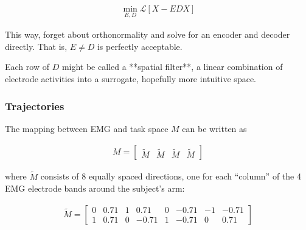 \documentclass[../main.tex]{subfiles}
\begin{document}
\begin{align}
  \min_{E,D}{\mathcal{L}\left[X - EDX\right]}
\end{align}

This way, forget about orthonormality and solve for an encoder and decoder directly. That is, $E\neq{D}$ is perfectly acceptable.

Each row of $D$ might be called a **spatial filter**, a linear combination of electrode activities into a surrogate, hopefully more intuitive space.

\subsubsection{Trajectories}



The mapping between EMG and task space $M$ can be written as

\begin{align}
M = \begin{bmatrix}\tilde{M} & \tilde{M} & \tilde{M} & \tilde{M}\end{bmatrix}
\end{align}

where $\tilde{M}$ consists of 8 equally spaced directions, one for
each ``column'' of the 4 EMG electrode bands around the subject's arm:

\begin{align}
\tilde{M} =
\begin{bmatrix}
0  & 0.71  & 1   & 0.71   & 0  & -0.71  & -1  & -0.71 \\
1  & 0.71  & 0  & -0.71  & 1   & -0.71   & 0   & 0.71
\end{bmatrix}
\end{align}
\end{document}
